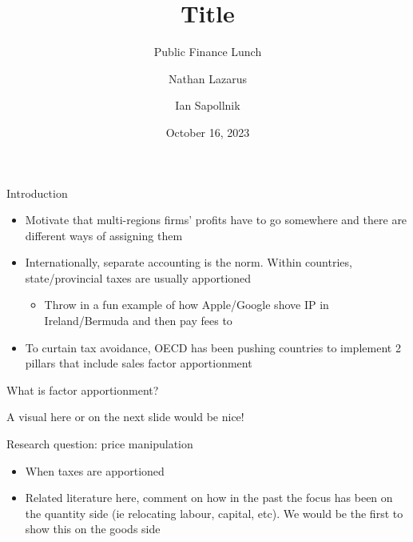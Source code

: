 \documentclass[aspectratio=43]{beamer}
\title{Title }
\subtitle{Public Finance Lunch}
\date{October 16, 2023}
\author{Nathan Lazarus \and Ian Sapollnik }
\begin{document}
\begin{frame}
\maketitle


\end{frame}

\begin{frame}{Introduction}
	\begin{itemize}
	\item Motivate that multi-regions firms' profits have to go somewhere and there are different ways of assigning them
	\item Internationally, separate accounting is the norm. Within countries, state/provincial taxes are usually apportioned
	\begin{itemize}
		\item Throw in a fun example of how Apple/Google shove IP in Ireland/Bermuda and then pay fees to 

	\end{itemize}
	\item To curtain tax avoidance, OECD has been pushing countries to implement 2 pillars that include sales factor apportionment
	\end{itemize}

\end{frame}

\begin{frame}{What is factor apportionment?}

A visual here or on the next slide would be nice!

\end{frame}

\begin{frame}{Research question: price manipulation}
\begin{itemize}
\item When taxes are apportioned 


\item Related literature here, comment on how in the past the focus has been on the quantity side (ie relocating labour, capital, etc). We would be the first to show this on the goods side
\end{itemize}


\end{frame}
\end{document}

